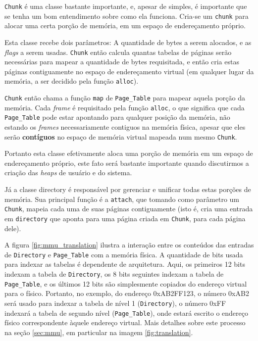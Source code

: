 \verb+Chunk+ é uma classe bastante importante, e, apesar de simples, é importante que se tenha um bom entendimento sobre como ela funciona.
Cria-se um \verb+chunk+ para alocar uma certa porção de memória, em um espaço de endereçamento próprio. 

Esta classe recebe dois parâmetros: A quantidade de bytes a serem alocados, e as \emph{flags} a serem usadas. \verb+Chunk+ então calcula quantas tabelas de páginas serão necessárias para mapear a quantidade de bytes requisitada, e então cria estas páginas contiguamente no espaço de endereçamento virtual (em qualquer lugar da memória, a ser decidido pela função \verb+alloc+).

\verb+Chunk+ então chama a função \verb+map+ de \verb+Page_Table+ para mapear aquela porção da memória. Cada \emph{frame} é requisitado pela função \verb+alloc+, o que significa que cada \verb+Page_Table+ pode estar apontando para qualquer posição da memória, não estando os \emph{frames} necessariamente contiguos na memória física, apesar que eles serão \textbf{contíguos} no espaço de memória virtual mapeada num mesmo \verb+Chunk+.

Portanto esta classe efetivamente aloca uma porção de memória em um espaço de endereçamento próprio, este fato será bastante importante quando discutirmos a criação das \emph{heaps} de usuário e do sistema.

Já a classe directory é responsável por gerenciar e unificar todas estas porções de memória. Sua principal função é a \verb+attach+, que tomando como parâmetro um \verb+Chunk+, mapeia cada uma de suas páginas contiguamente (isto é, cria uma entrada em \verb=directory= que aponta para uma página criada em \verb+Chunk+, para cada página dele).

A figura \ref{fig:mmu_translation} ilustra a interação entre os conteúdos das entradas de \verb+Directory+ e \verb+Page_Table+ com a memória física. A quantidade de bits usada para indexar as tabelas é dependente de arquitetura. Aqui, os primeiros 12 bits indexam a tabela de \verb+Directory+, os 8 bits seguintes indexam a tabela de \verb+Page_Table+, e os últimos 12 bits são simplesmente copiados do endereço virtual para o físico.
Portanto, no exemplo, do endereço 0xAB2FF123, o número 0xAB2 será usado para indexar a tabela de nível 1 (\verb=Directory=), o número 0xFF indexará a tabela de segundo nível (\verb+Page_Table+), onde estará escrito o endereço físico correspondente àquele endereço virtual.
Mais detalhes sobre este processo na seção \ref{sec:mmu}, em particular na imagem \ref{fig:translation}.


